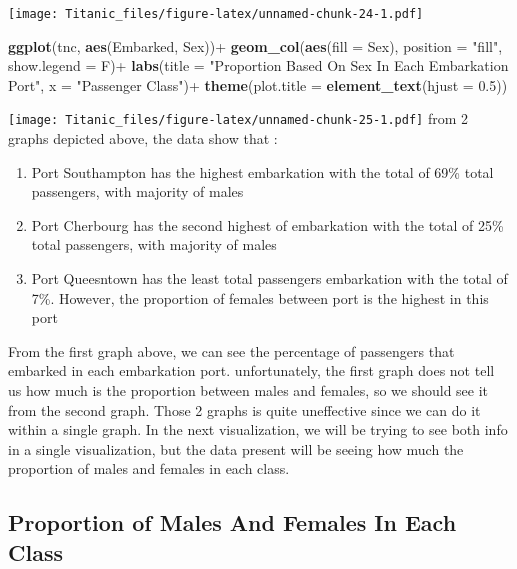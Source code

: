 \documentclass[
]{article}
\newenvironment{Shaded}{\begin{snugshade}}{\end{snugshade}}
\newcommand{\AttributeTok}[1]{\textcolor[rgb]{0.74,0.68,0.62}{#1}}
\newcommand{\FloatTok}[1]{\textcolor[rgb]{0.27,0.67,0.26}{#1}}
\newcommand{\FunctionTok}[1]{\textcolor[rgb]{1.00,0.58,0.35}{\textbf{#1}}}
\newcommand{\NormalTok}[1]{\textcolor[rgb]{0.74,0.68,0.62}{#1}}
\newcommand{\SpecialCharTok}[1]{\textcolor[rgb]{0.02,0.61,0.04}{#1}}
\newcommand{\StringTok}[1]{\textcolor[rgb]{0.02,0.61,0.04}{#1}}
\begin{document}
\texttt{[image: Titanic\_files/figure-latex/unnamed-chunk-24-1.pdf]}

\begin{Shaded}
\begin{Highlighting}[]
\FunctionTok{ggplot}\NormalTok{(tnc, }\FunctionTok{aes}\NormalTok{(Embarked, Sex))}\SpecialCharTok{+}
  \FunctionTok{geom\_col}\NormalTok{(}\FunctionTok{aes}\NormalTok{(}\AttributeTok{fill =}\NormalTok{ Sex), }\AttributeTok{position =} \StringTok{"fill"}\NormalTok{, }
           \AttributeTok{show.legend =}\NormalTok{ F)}\SpecialCharTok{+}
  \FunctionTok{labs}\NormalTok{(}\AttributeTok{title =} \StringTok{"Proportion Based On Sex In Each Embarkation Port"}\NormalTok{, }
       \AttributeTok{x =} \StringTok{"Passenger Class"}\NormalTok{)}\SpecialCharTok{+}
  \FunctionTok{theme}\NormalTok{(}\AttributeTok{plot.title =} \FunctionTok{element\_text}\NormalTok{(}\AttributeTok{hjust =} \FloatTok{0.5}\NormalTok{))}
\end{Highlighting}
\end{Shaded}

\texttt{[image: Titanic\_files/figure-latex/unnamed-chunk-25-1.pdf]} from
2 graphs depicted above, the data show that :

\begin{enumerate}
\def\labelenumi{\arabic{enumi}.}
\item
  Port Southampton has the highest embarkation with the total of 69\%
  total passengers, with majority of males
\item
  Port Cherbourg has the second highest of embarkation with the total of
  25\% total passengers, with majority of males
\item
  Port Queesntown has the least total passengers embarkation with the
  total of 7\%. However, the proportion of females between port is the
  highest in this port
\end{enumerate}

From the first graph above, we can see the percentage of passengers that
embarked in each embarkation port. unfortunately, the first graph does
not tell us how much is the proportion between males and females, so we
should see it from the second graph. Those 2 graphs is quite uneffective
since we can do it within a single graph. In the next visualization, we
will be trying to see both info in a single visualization, but the data
present will be seeing how much the proportion of males and females in
each class.

\hypertarget{proportion-of-males-and-females-in-each-class}{%
\subsection{Proportion of Males And Females In Each
Class}\label{proportion-of-males-and-females-in-each-class}}
\end{document}
